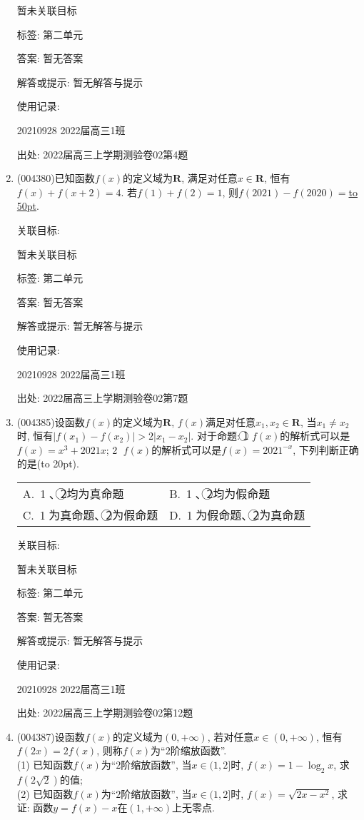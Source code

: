\documentclass[10pt,a4paper]{article}
\newcommand{\blank}[1]{\underline{\hbox to #1pt{}}}
\newcommand{\bracket}[1]{(\hbox to #1pt{})}
\newcommand{\twoch}[4]{\par\begin{tabular}{p{.46\textwidth}p{.46\textwidth}}
A.~#1& B.~#2\\
C.~#3& D.~#4
\end{tabular}}
\begin{document}
\begin{enumerate}[1.]
暂未关联目标



标签: 第二单元

答案: 暂无答案

解答或提示: 暂无解答与提示

使用记录:

20210928	2022届高三1班	


出处: 2022届高三上学期测验卷02第4题
\item { (004380)}已知函数$f(x)$的定义域为$\mathbf{R}$, 满足对任意$x\in \mathbf{R}$, 恒有$f(x)+f(x+2)=4$. 若$f(1)+f(2)=1$, 则$f(2021)-f(2020)=$\blank{50}.


关联目标:

暂未关联目标



标签: 第二单元

答案: 暂无答案

解答或提示: 暂无解答与提示

使用记录:

20210928	2022届高三1班	


出处: 2022届高三上学期测验卷02第7题
\item { (004385)}设函数$f(x)$的定义域为$\mathbf{R}$, $f(x)$满足对任意$x_1,x_2\in \mathbf{R}$, 当$x_1\ne x_2$时, 恒有$|f(x_1)-f(x_2)|>2|x_1-x_2|$. 对于命题: \textcircled{1} $f(x)$的解析式可以是$f(x)=x^3+2021x$; \textcircled{2} $f(x)$的解析式可以是$f(x)=2021^{-x}$, 下列判断正确的是\bracket{20}.
\twoch{\textcircled{1}、\textcircled{2}均为真命题}{\textcircled{1}、\textcircled{2}均为假命题}{\textcircled{1}为真命题、\textcircled{2}为假命题}{\textcircled{1}为假命题、\textcircled{2}为真命题}


关联目标:

暂未关联目标



标签: 第二单元

答案: 暂无答案

解答或提示: 暂无解答与提示

使用记录:

20210928	2022届高三1班	


出处: 2022届高三上学期测验卷02第12题
\item { (004387)}设函数$f(x)$的定义域为$(0,+\infty)$, 若对任意$x\in (0,+\infty)$, 恒有$f(2x)=2f(x)$, 则称$f(x)$为``$2$阶缩放函数''.\\
(1) 已知函数$f(x)$为``$2$阶缩放函数'', 当$x\in (1,2]$时, $f(x)=1-\log_2 x$, 求$f(2\sqrt{2})$的值;\\
(2) 已知函数$f(x)$为``$2$阶缩放函数'', 当$x\in (1,2]$时, $f(x)=\sqrt{2x-x^2}$, 求证: 函数$y=f(x)-x$在$(1,+\infty)$上无零点.



\end{enumerate}
\end{document}
